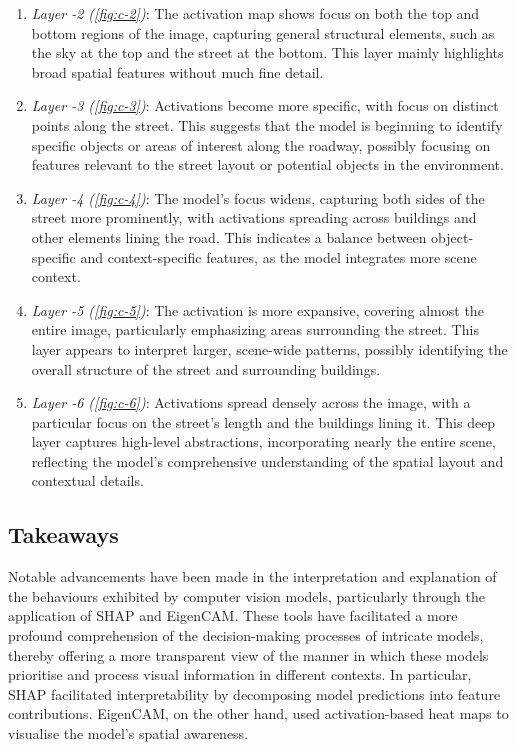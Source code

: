 \begin{enumerate}
    \item \textit{Layer -2 (\ref{fig:c-2})}: The activation map shows focus on both the top and bottom regions of the image, capturing general structural elements, such as the sky at the top and the street at the bottom. This layer mainly highlights broad spatial features without much fine detail.
    \item \textit{Layer -3 (\ref{fig:c-3})}: Activations become more specific, with focus on distinct points along the street. This suggests that the model is beginning to identify specific objects or areas of interest along the roadway, possibly focusing on features relevant to the street layout or potential objects in the environment.
    \item \textit{Layer -4 (\ref{fig:c-4})}: The model's focus widens, capturing both sides of the street more prominently, with activations spreading across buildings and other elements lining the road. This indicates a balance between object-specific and context-specific features, as the model integrates more scene context.
    \item \textit{Layer -5 (\ref{fig:c-5})}: The activation is more expansive, covering almost the entire image, particularly emphasizing areas surrounding the street. This layer appears to interpret larger, scene-wide patterns, possibly identifying the overall structure of the street and surrounding buildings.
    \item \textit{Layer -6 (\ref{fig:c-6})}:  Activations spread densely across the image, with a particular focus on the street's length and the buildings lining it. This deep layer captures high-level abstractions, incorporating nearly the entire scene, reflecting the model's comprehensive understanding of the spatial layout and contextual details.

\end{enumerate}

\subsection{Takeaways}\label{subsec:takeaways-and-suggestions-for-future-development}


Notable advancements have been made in the interpretation and explanation of the behaviours exhibited by computer vision models, particularly through the application of SHAP and EigenCAM.
These tools have facilitated a more profound comprehension of the decision-making processes of intricate models, thereby offering a more transparent view of the manner in which these models prioritise and process visual information in different contexts.
In particular, SHAP facilitated interpretability by decomposing model predictions into feature contributions.
EigenCAM, on the other hand, used activation-based heat maps to visualise the model's spatial awareness.

